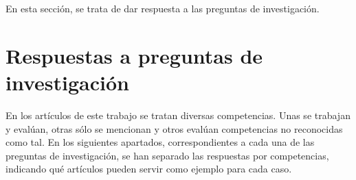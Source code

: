 En esta sección, se trata de dar respuesta a las preguntas de investigación.



\section{Respuestas a preguntas de investigación}
En los artículos de este trabajo se tratan diversas competencias. Unas se trabajan y evalúan, otras sólo se mencionan y otros evalúan competencias no reconocidas como tal. En los siguientes apartados, correspondientes a cada una de las preguntas de investigación, se han separado las respuestas por competencias, indicando qué artículos pueden servir como ejemplo para cada caso. %

